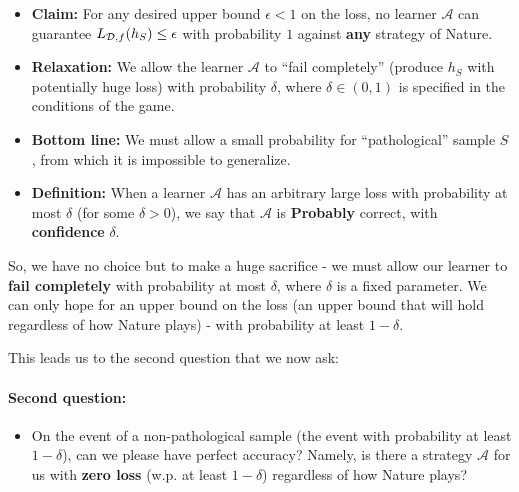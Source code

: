\documentclass[11pt]{article}
\newcommand{\Ac}{\mathcal{A}}
\begin{document}
{\begin{itemize}
      \item {\bf Claim:} For any desired upper bound $\epsilon<1$ on the loss, 
	no learner $\Ac$ can guarantee $L_{\mathcal{D},f}(h_S) \le
  \epsilon$ with probability $1$ against {\bf any} strategy of Nature. 
\item {\bf Relaxation:} We allow the learner $\Ac$ to ``fail completely''
  (produce $h_S$ with potentially huge loss) with
  probability $\delta$, where $\delta \in (0,1)$ is specified in the conditions
  of the game.
\item {\bf Bottom line:} We must allow a small probability for
  ``pathological'' sample $S$, from which it is impossible to generalize. 
\item {\bf Definition:} When a learner $\Ac$ has  an arbitrary large loss with probability
  at most $\delta$ (for some $\delta>0$), we say that $\Ac$ is {\bf Probably}
  correct, with {\bf confidence} $\delta$.
\end{itemize}

So, we have no choice but to make a huge sacrifice - we must allow our learner to
       {\bf fail completely} with probability at most $\delta$, where $\delta$ is a fixed parameter. 
       We can only hope for an upper bound on the
       loss (an upper bound that will hold regardless of how Nature plays) - with probability at least  $1-\delta$. 

   This leads us to the second question that we now ask:
   \paragraph{Second question:}
   \begin{itemize}

     \item On the event of a non-pathological sample (the event with probability at
	 least 
       $1-\delta$), can we please have perfect accuracy?  Namely, is there a
       strategy
       $\Ac$ for us with {\bf zero loss} (w.p. at least $1-\delta$) regardless of how Nature plays?
   \end{itemize}
  
}
\end{document}
